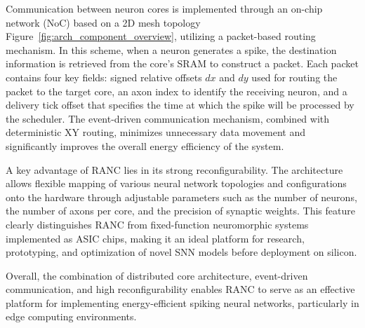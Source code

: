 \documentclass[../main.tex]{subfiles}
\begin{document}
Communication between neuron cores is implemented through an on-chip network (NoC) based on a 2D mesh topology Figure~\ref{fig:arch_component_overview}, utilizing a packet-based routing mechanism. In this scheme, when a neuron generates a spike, the destination information is retrieved from the core’s SRAM to construct a packet. Each packet contains four key fields: signed relative offsets $dx$ and $dy$ used for routing the packet to the target core, an axon index to identify the receiving neuron, and a delivery tick offset that specifies the time at which the spike will be processed by the scheduler. The event-driven communication mechanism, combined with deterministic XY routing, minimizes unnecessary data movement and significantly improves the overall energy efficiency of the system.

A key advantage of RANC\cite{RANC} lies in its strong reconfigurability. The architecture allows flexible mapping of various neural network topologies and configurations onto the hardware through adjustable parameters such as the number of neurons, the number of axons per core, and the precision of synaptic weights. This feature clearly distinguishes RANC\cite{RANC} from fixed-function neuromorphic systems implemented as ASIC chips, making it an ideal platform for research, prototyping, and optimization of novel SNN models before deployment on silicon.

Overall, the combination of distributed core architecture, event-driven communication, and high reconfigurability enables RANC\cite{RANC} to serve as an effective platform for implementing energy-efficient spiking neural networks, particularly in edge computing environments.
\end{document}
